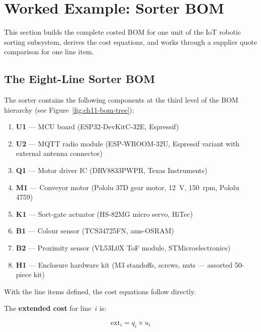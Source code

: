 \section{Worked Example: Sorter BOM}
\label{sec:ch11-worked}

This section builds the complete costed BOM for one unit of the IoT robotic
sorting subsystem, derives the cost equations, and works through a supplier
quote comparison for one line item.

\subsection{The Eight-Line Sorter BOM}
\label{sec:ch11-worked-bom}

The sorter contains the following components at the third level of the BOM
hierarchy (see Figure~\ref{fig:ch11-bom-tree}):

\begin{enumerate}
  \item[(a)] \textbf{U1} --- MCU board (ESP32-DevKitC-32E, Espressif)
  \item[(b)] \textbf{U2} --- MQTT radio module (ESP-WROOM-32U, Espressif
        variant with external antenna connector)
  \item[(c)] \textbf{Q1} --- Motor driver IC (DRV8833PWPR, Texas Instruments)
  \item[(d)] \textbf{M1} --- Conveyor motor (Pololu 37D gear motor, 12~V,
        150~rpm, Pololu 4759)
  \item[(e)] \textbf{K1} --- Sort-gate actuator (HS-82MG micro servo, HiTec)
  \item[(f)] \textbf{B1} --- Colour sensor (TCS34725FN, ams-OSRAM)
  \item[(g)] \textbf{B2} --- Proximity sensor (VL53L0X ToF module, STMicroelectronics)
  \item[(h)] \textbf{H1} --- Enclosure hardware kit (M3 standoffs, screws, nuts
        --- assorted 50-piece kit)
\end{enumerate}

With the line items defined, the cost equations follow directly.

The \textbf{extended cost} for line~$i$ is:

\begin{equation}\label{eq:ch11-ext}
  \text{ext}_i = q_i \times u_i
\end{equation}


